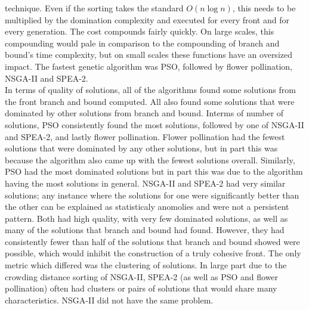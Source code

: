 \documentclass{article}
\begin{document}
    technique. Even if the sorting takes the standard \(O(n \log{n})\), this needs to be multiplied by the domination complexity and executed for every front and for 
    every generation. The cost compounds fairly quickly. On large scales, this compounding would pale in comparison to the compounding of branch and bound's time
    complexity, but on small scales these functions have an oversized impact. The fastest genetic algorithm was PSO, followed by flower pollination, NSGA-II and SPEA-2.\\
    In terms of quality of solutions, all of the algorithms found some solutions from the front branch and bound computed. All also found some solutions that were 
    dominated by other solutions from branch and bound. Interms of number of solutions, PSO consistently found the most solutions, followed by one of NSGA-II and
    SPEA-2, and lastly flower pollination. Flower pollination had the fewest solutions that were dominated by any other solutions, but in part this was because the
    algorithm also came up with the fewest solutions overall. Similarly, PSO had the most dominated solutions but in part this was due to the algorithm having the 
    most solutions in general. NSGA-II and SPEA-2 had very similar solutions; any instance where the solutions for one were significantly better than the other 
    can be explained as statisticaly anomolies and were not a persistent pattern. Both had high quality, with very few dominated solutions, as well as many of 
    the solutions that branch and bound had found. However, they had consistently fewer than half of the solutions that branch and bound showed were possible, 
    which would inhibit the construction of a truly cohesive front. The only metric which differed was the clustering of solutions. In large part due to the crowding
    distance sorting of NSGA-II, SPEA-2 (as well as PSO and flower pollination) often had clusters or pairs of solutions that would share many characteristics. 
    NSGA-II did not have the same problem. 
\end{document}
